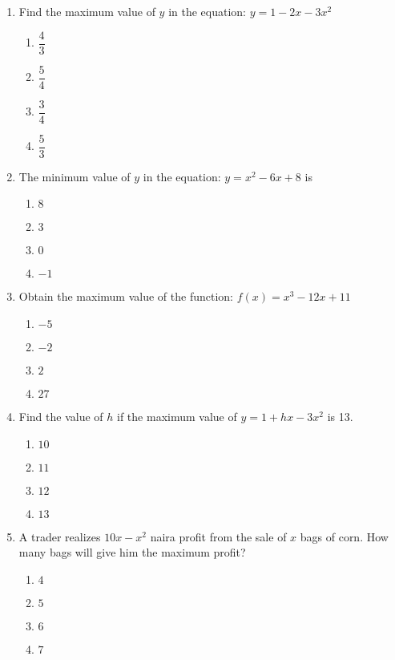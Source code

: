 \begin{multicols}{2}
\begin{enumerate}[label={\arabic*.}]
\begin{enumerate}[label={\Alph*.}]
      \end{enumerate}
    \item Find the maximum value of \(y\) in the equation: \(y = 1 - 2x - 3{x}^{2}\)
      \begin{enumerate}[label={\Alph*.}]
        \item \(\dfrac{4}{3}\)
        \item \(\dfrac{5}{4}\)
        \item \(\dfrac{3}{4}\)
        \item \(\dfrac{5}{3}\)
      \end{enumerate}
    \item The minimum value of \(y\) in the equation: \(y = {x}^{2} - 6x + 8\) is
      \begin{enumerate}[label={\Alph*.}]
        \item \(8\)
        \item \(3\)
        \item \(0\)
        \item \(-1\)
      \end{enumerate}
    \item Obtain the maximum value of the function: \(f(x) = {x}^{3} - 12x + 11\)
      \begin{enumerate}[label={\Alph*.}]
        \item \(-5\)
        \item \(-2\)
        \item \(2\)
        \item \(27\)
      \end{enumerate}
    \item Find the value of \(h\) if the maximum value of \(y = 1 + hx - 3{x}^{2}\) is 13.
      \begin{enumerate}[label={\Alph*.}]
        \item \(10\)
        \item \(11\)
        \item \(12\)
        \item \(13\)
      \end{enumerate}
    \item A trader realizes \(10x - {x}^{2}\) naira profit from the sale of \(x\) bags of corn. How many bags will give him the maximum profit?
      \begin{enumerate}[label={\Alph*.}]
        \item \(4\)
        \item \(5\)
        \item \(6\)
        \item \(7\)

\end{enumerate}
\end{enumerate}
\end{multicols}
